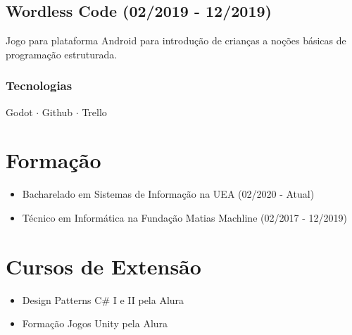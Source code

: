\documentclass{article}
\begin{document}
\subsection{Wordless Code (02/2019 - 12/2019)}
Jogo para plataforma Android para introdução de crianças a noções básicas de
programação estruturada.

\subsubsection{Tecnologias}
Godot $\cdot$
Github $\cdot$
Trello

\section{Formação}
\begin{itemize}
	\item Bacharelado em Sistemas de Informação na UEA (02/2020 - Atual)
	\item Técnico em Informática na Fundação Matias Machline (02/2017 - 12/2019)
\end{itemize}

\section{Cursos de Extensão}
\begin{itemize}
	\item Design Patterns C{\#} I e II pela Alura
	\item Formação Jogos Unity pela Alura
\end{itemize}
\end{document}
